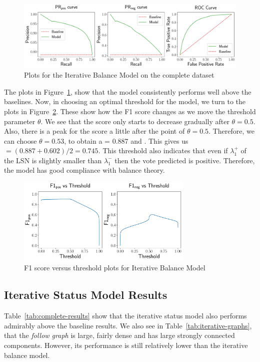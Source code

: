 \begin{figure}[htp]
    \centering
    \includegraphics[width=\textwidth]{images/iterative_Balance.pdf}
    \caption{Plots for the Iterative Balance Model on the complete \wikirfa dataset}
    \label{fig:complete-iterative-balance}
\end{figure}
The plots in Figure~\ref{fig:complete-iterative-balance}, show that the model consistently performs well above the baselines.
Now, in choosing an optimal threshold for the model, we turn to the plots in Figure~\ref{fig:complete-iterative-balance-f1}.
These show how the F1 score changes as we move the threshold parameter $\theta$.
We see that the \posF score only starts to decrease gradually after $\theta=0.5$.
Also, there is a peak for the \negF score a little after the point of $\theta=0.5$.
Therefore, we can choose $\theta=0.53$, to obtain a \posF = 0.887 and .
This gives us \macroF $= (0.887+0.602)/2 = 0.745$.
This threshold also indicates that even if $\lambda_{1}^{+}$ of the LSN is slightly smaller than $\lambda_{1}^{-}$ then the vote predicted is positive.
Therefore, the model has good compliance with balance theory.
\begin{figure}[htp]
    \centering
    \includegraphics[width=0.75\textwidth]{images/iterative_Balance_f1.pdf}
    \caption{F1 score versus threshold plots for Iterative Balance Model}
    \label{fig:complete-iterative-balance-f1}
\end{figure}

\subsection{Iterative Status Model Results}
Table~\ref{tab:complete-results} show that the iterative status model also performs admirably above the baseline results.
We also see in Table~\ref{tab:iterative-graphs}, that the \textit{follow graph} is large, fairly dense and has large strongly connected components.
However, its performance is still relatively lower than the iterative balance model.

